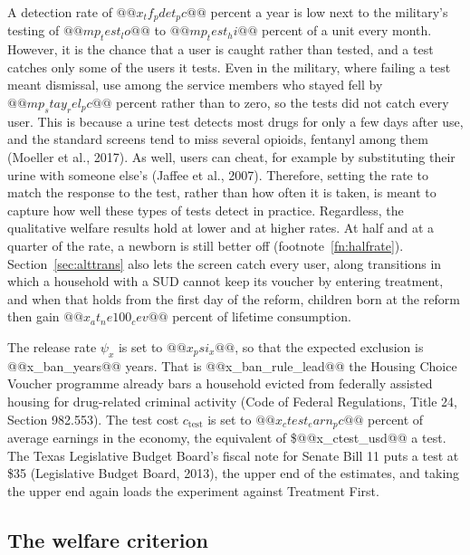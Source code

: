 \documentclass[10pt]{article}
\begin{document}
A detection rate of $@@x_tf_pdet_pc@@$ percent a year is low next to the military's testing of $@@mp_test_lo@@$ to $@@mp_test_hi@@$ percent of a unit every month. However, it is the chance that a user is caught rather than tested, and a test catches only some of the users it tests. Even in the military, where failing a test meant dismissal, use among the service members who stayed fell by $@@mp_stay_rel_pc@@$ percent rather than to zero, so the tests did not catch every user.  This is because a urine test detects most drugs for only a few days after use, and the standard  screens tend to miss several opioids, fentanyl among them (Moeller et al., 2017). As well,  users can cheat, for example by substituting their urine with someone else's  (Jaffee et al., 2007).  Therefore, setting the rate to match the response to the test, rather than how often it is taken,  is meant to capture how well these types of tests detect in practice.  Regardless, the qualitative welfare results hold at lower and at higher rates. At half and at a quarter of the rate, a newborn is still better off (footnote~\ref{fn:halfrate}). Section~\ref{sec:alttrans} also lets the screen catch every user,  along transitions in which a household with a SUD cannot keep its voucher by entering treatment, and when that holds from the first day of the reform, children born at the reform then gain $@@x_at_ne100_cev@@$ percent of lifetime consumption.   

The release rate $\psi_x$ is set to $@@x_psi_x@@$, so that the expected
exclusion is @@x_ban_years@@ years. That is @@x_ban_rule_lead@@ the Housing Choice Voucher programme
already bars a household evicted from federally assisted housing for drug-related criminal
activity (Code of Federal Regulations, Title 24, Section 982.553). The test cost $c_{\mathrm{test}}$ is set to $@@x_ctest_earn_pc@@$ percent of average earnings in the economy, the equivalent of
\$@@x_ctest_usd@@ a test. The Texas Legislative Budget Board's fiscal note for Senate Bill 11 puts a test at \$35 (Legislative Budget Board, 2013), the upper end of the estimates, and taking the upper end again loads the experiment against Treatment First.

\subsection{The welfare criterion}\label{sec:cev}
\end{document}
